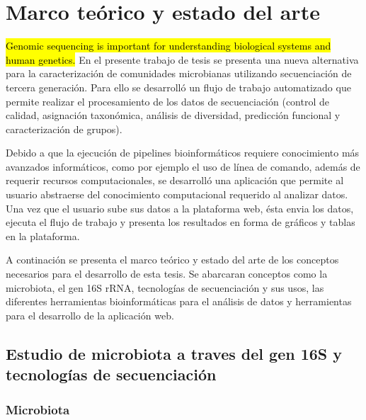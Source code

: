 \chapter{Marco teórico y estado del arte}
\hl{Genomic sequencing is important for understanding biological systems and human genetics.}
En el presente trabajo de tesis se presenta una nueva alternativa para la caracterización de comunidades microbianas utilizando secuenciación de tercera generación. Para ello se  desarrolló un flujo de trabajo automatizado que permite realizar el procesamiento de los datos de secuenciación (control de calidad, asignación taxonómica, análisis de diversidad, predicción funcional y caracterización de grupos). 

Debido a que la ejecución de pipelines bioinformáticos requiere conocimiento más avanzados informáticos, como por ejemplo el uso de línea de comando, además de requerir recursos computacionales, se desarrolló una aplicación que permite al usuario abstraerse del conocimiento computacional requerido al analizar datos. Una vez que el usuario sube sus datos a la plataforma web, ésta envia los datos, ejecuta el flujo de trabajo y presenta los resultados en forma de gráficos y tablas en la plataforma.


A continación se presenta el marco teórico y estado del arte de los conceptos necesarios para el desarrollo de esta tesis. %
Se abarcaran conceptos como la microbiota, el gen 16S rRNA, tecnologías de secuenciación y sus usos, las diferentes herramientas bioinformáticas para el análisis de datos y herramientas para el desarrollo de la aplicación web.
\section{Estudio de microbiota a traves del gen 16S y tecnologías de secuenciación}
\subsection{Microbiota}

